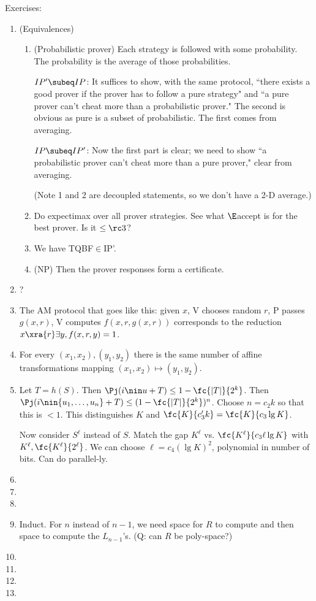 Exercises:
\begin{enumerate}
\item (Equivalences) 
\begin{enumerate}
\item
(Probabilistic prover) Each strategy is followed with some probability. The probability is the average of those probabilities.

$IP'\subeq IP$: It suffices to show, with the same protocol, ``there exists a good prover if the prover has to follow a pure strategy" and ``a pure prover can't cheat more than a probabilistic prover." The second is obvious as pure is a subset of probabilistic. The first comes from averaging.

$IP\subeq IP'$: Now the first part is clear; we need to show ``a probabilistic prover can't cheat more than a pure prover," clear from averaging.

(Note 1 and 2 are decoupled statements, so we don't have a 2-D average.)
\item %
Do expectimax over all prover strategies. See what $\E$accept is for the best prover. Is it $\le \rc3$?
\item We have TQBF$\in$IP'.
\item (NP) Then the prover responses form a certificate.
\end{enumerate}
\item ?
\item The AM protocol that goes like this: given $x$, V chooses random $r$, P passes $g(x,r)$, V computes $f(x,r,g(x,r))$ corresponds to the reduction $x\xra{r} \exists y, f(x,r,y)=1$.
\item For every $(x_1,x_2),(y_1,y_2)$ there is the same number of affine transformations mapping $(x_1,x_2)\mapsto (y_1,y_2)$.
\item Let $T=h(S)$. Then $\Pj(i\nin u+T)\le 1-\fc{|T|}{2^k}$. Then $\Pj(i\nin \{u_1,\ldots, u_n\}+T)\le (1-\fc{|T|}{2^k})^n$.  Choose $n=c_2k$ so that this is $<1$. This distinguishes $K$ and $\fc{K}{c_3'k}=\fc{K}{c_3\lg K}$. 

Now consider $S^\ell$ instead of $S$. Match the gap $K^{\ell}$ vs. $\fc{K^\ell}{c_3\ell\lg K}$ with $K^\ell,\fc{K^{\ell}}{2^{\ell}}$. We can choose $\ell=c_4 (\lg K)^2$, polynomial in number of bits. Can do parallel-ly.
\item {}
\item {}
\item
\item Induct. For $n$ instead of $n-1$, we need space for $R$ to compute and then space to compute the $L_{n-1}$'s.
(Q: can $R$ be poly-space?) 
\item 
\item{}
\item
\item
\end{enumerate}
